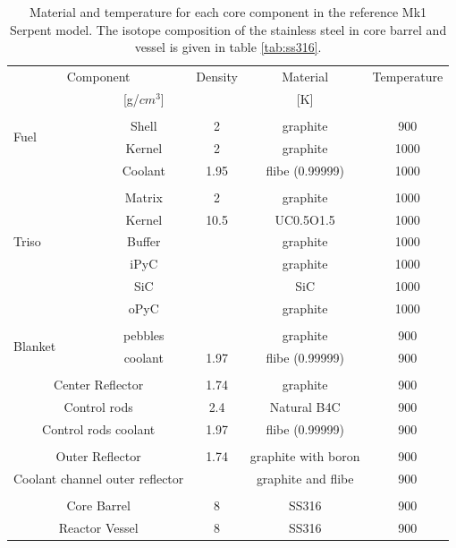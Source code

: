\documentclass{elsarticle}
\begin{document}
\begin{table}
 \centering
 \begin{tabular}{lcccc}
    \multicolumn{2}{c}{Component} & Density & Material & Temperature\\
    &  [g/$cm^3$] & & [K]\\
    \hline\\
    \multirow{2}{*}{Fuel} & Shell & 2 & graphite & 900\\
                          & Kernel & 2 & graphite & 1000\\
                          & Coolant & 1.95 & flibe (0.99999) & 1000\\
                          \hline\\
    \multirow{5}{*}{Triso} & Matrix & 2 & graphite & 1000\\
                           & Kernel & 10.5 & UC0.5O1.5 & 1000\\
                           & Buffer & & graphite & 1000\\
                           & iPyC & & graphite & 1000\\
                           & SiC & & SiC & 1000\\
                           & oPyC & & graphite & 1000\\
                           \hline\\
    \multirow{2}{*}{Blanket} & pebbles & & graphite & 900\\
                             & coolant &  1.97 & flibe (0.99999) & 900\\
                             \hline\\
    \multicolumn{2}{c}{Center Reflector} & 1.74 & graphite & 900\\
    \multicolumn{2}{c}{Control rods}& 2.4 & Natural B4C & 900\\
    \multicolumn{2}{c}{Control rods coolant}& 1.97 & flibe (0.99999) & 900\\
    \hline\\
    \multicolumn{2}{c}{Outer Reflector} & 1.74 & graphite with boron & 900\\
    \multicolumn{2}{c}{Coolant channel outer reflector}& & graphite and flibe & 900\\
    \hline\\
     \multicolumn{2}{c}{Core Barrel} & 8 & SS316 & 900\\
     \multicolumn{2}{c}{Reactor Vessel}& 8  & SS316 & 900\\
 \end{tabular}
 \caption{Material and temperature for each core component in the reference Mk1 Serpent model. The isotope composition of the stainless steel in core barrel and vessel is given in table \ref{tab:ss316}\cite{ESPI}.}
 \label{tab:matT}
\end{table}
\end{document}
